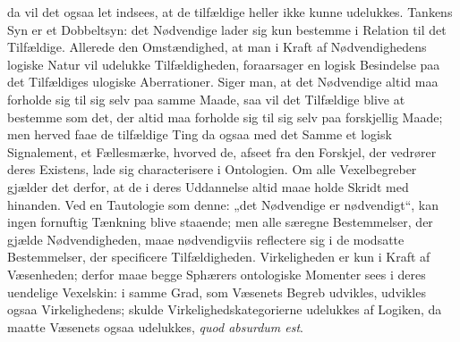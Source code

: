 \documentclass[12pt]{book}
\begin{document}
da vil det ogsaa let indsees, at de tilfældige heller ikke kunne udelukkes. Tankens Syn er et
Dobbeltsyn: det Nødvendige lader sig kun bestemme i Relation til det Tilfældige. Allerede den
Omstændighed, at man i Kraft af Nødvendighedens logiske Natur vil udelukke Tilfældigheden,
foraarsager en logisk Besindelse paa det Tilfældiges ulogiske Aberrationer. Siger man, at det
Nødvendige altid maa forholde sig til sig selv paa samme Maade, saa vil det Tilfældige blive at
bestemme som det, der altid maa forholde sig til sig selv paa forskjellig Maade; men herved
faae de tilfældige Ting da ogsaa med det Samme et logisk Signalement, et Fællesmærke, hvorved
de, afseet fra den Forskjel, der vedrører deres Existens, lade sig characterisere i Ontologien.
Om alle Vexelbegreber gjælder det derfor, at de i deres Uddannelse altid maae holde Skridt med
hinanden. Ved en Tautologie som denne: „det Nødvendige er nødvendigt“, kan ingen fornuftig
Tænkning blive staaende; men alle særegne Bestemmelser, der gjælde Nødvendigheden, maae
nødvendigviis reflectere sig i de modsatte Bestemmelser, der specificere Tilfældigheden.
Virkeligheden er kun i Kraft af Væsenheden; derfor maae begge Sphærers ontologiske Momenter
sees i deres uendelige Vexelskin: i samme Grad, som Væsenets Begreb udvikles, udvikles ogsaa
Virkelighedens; skulde Virkelighedskategorierne udelukkes af Logiken, da maatte Væsenets ogsaa
udelukkes, \textit{quod absurdum est}.
\end{document}
